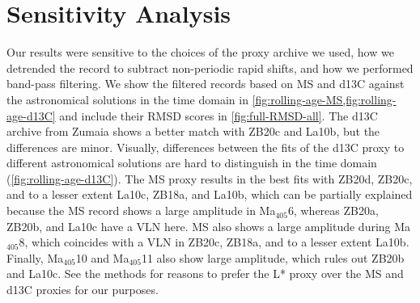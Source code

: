 \documentclass[draft]{agujournal2019}
\newcommand{\ma}[1]{Ma\(_{405}\)#1} %
\begin{document}

\renewcommand\thefigure{A\arabic{figure}}
\setcounter{figure}{0}

\section{Sensitivity Analysis}\label{sec:sensitivity}

Our results were sensitive to the choices of the proxy archive we used, how we detrended the record to subtract non-periodic rapid shifts, and how we performed band-pass filtering.
We show the filtered records based on \gls{MS} and \gls{d13C} against the astronomical solutions in the time domain in \cref{fig:rolling-age-MS,fig:rolling-age-d13C} and include their \gls{RMSD} scores in \cref{fig:full-RMSD-all}.
The \gls{d13C} archive from Zumaia shows a better match with ZB20c and La10b, but the differences are minor.
Visually, differences between the fits of the \gls{d13C} proxy to different astronomical solutions are hard to distinguish in the time domain (\cref{fig:rolling-age-d13C}).
The \gls{MS} proxy results in the best fits with ZB20d, ZB20c, and to a lesser extent La10c, ZB18a, and La10b, which can be partially explained because the \gls{MS} record shows a large amplitude in \ma{6}, whereas ZB20a, ZB20b, and La10c have a \gls{VLN} here.
\gls{MS} also shows a large amplitude during \ma{8}, which coincides with a \gls{VLN} in ZB20c, ZB18a, and to a lesser extent La10b.
Finally, \ma{10} and \ma{11} also show large amplitude, which rules out ZB20b and La10c.
See the methods for reasons to prefer the \gls{L*} proxy over the \gls{MS} and \gls{d13C} proxies for our purposes.
\end{document}

